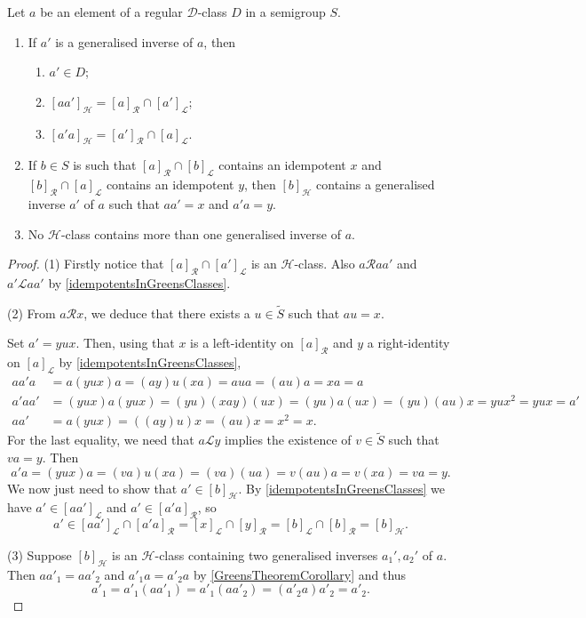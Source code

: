 \begin{proposition} \label{inversesIdempotentsDclass}
Let $a$ be an element of a regular $\mathcal{D}$-class $D$ in a semigroup $S$.
\begin{enumerate}
\item If $a'$ is a generalised inverse of $a$, then
\begin{enumerate}
\item $a' \in D$;
\item $[aa']_\mathcal{H} = [a]_\mathcal{R}\cap [a']_\mathcal{L}$;
\item $[a'a]_\mathcal{H} = [a']_\mathcal{R}\cap [a]_\mathcal{L}$.
\end{enumerate}
\item If $b\in S$ is such that $[a]_\mathcal{R}\cap [b]_\mathcal{L}$ contains an idempotent $x$ and $[b]_\mathcal{R}\cap [a]_\mathcal{L}$ contains an idempotent $y$, then $[b]_\mathcal{H}$ contains a generalised inverse $a'$ of $a$ such that $aa' = x$ and $a'a = y$.
\item No $\mathcal{H}$-class contains more than one generalised inverse of $a$.
\end{enumerate}
\end{proposition}
\begin{proof}
(1) Firstly notice that $[a]_\mathcal{R}\cap [a']_\mathcal{L}$ is an $\mathcal{H}$-class. Also $a\mathcal{R}aa'$ and $a'\mathcal{L}aa'$ by \ref{idempotentsInGreensClasses}.

(2) From $a\mathcal{R}x$, we deduce that there exists a $u\in\widetilde{S}$ such that $au = x$. 

Set $a' = yux$. Then, using that $x$ is a left-identity on $[a]_\mathcal{R}$ and $y$ a right-identity on $[a]_\mathcal{L}$ by \ref{idempotentsInGreensClasses},
\begin{align*}
aa'a &= a(yux)a = (ay)u(xa) = aua = (au)a = xa = a \\
a'aa' &= (yux)a(yux) = (yu)(xay)(ux) = (yu)a(ux) = (yu)(au)x = yux^2 = yux = a' \\
aa' &= a(yux) = ((ay)u)x = (au)x = x^2 = x.
\end{align*}
For the last equality, we need that $a\mathcal{L}y$ implies the existence of $v\in \widetilde{S}$ such that $va = y$. Then
\[ a'a = (yux)a = (va)u(xa) = (va)(ua) = v(au)a = v(xa) = va = y. \]
We now just need to show that $a' \in [b]_\mathcal{H}$. By \ref{idempotentsInGreensClasses} we have $a'\in [aa']_{\mathcal{L}}$ and $a'\in [a'a]_{\mathcal{R}}$, so
\[ a' \in [aa']_{\mathcal{L}} \cap [a'a]_{\mathcal{R}} = [x]_{\mathcal{L}} \cap [y]_{\mathcal{R}} = [b]_{\mathcal{L}} \cap [b]_{\mathcal{R}} = [b]_\mathcal{H}. \]

(3) Suppose $[b]_\mathcal{H}$ is an $\mathcal{H}$-class containing two generalised inverses $a_1', a_2'$ of $a$. Then $aa'_1 = aa'_2$ and $a'_1a = a'_2a$ by \ref{GreensTheoremCorollary} and thus
\[ a'_1 = a'_1(aa'_1) = a'_1(aa'_2) = (a'_2a)a'_2 = a'_2. \]
\end{proof}
